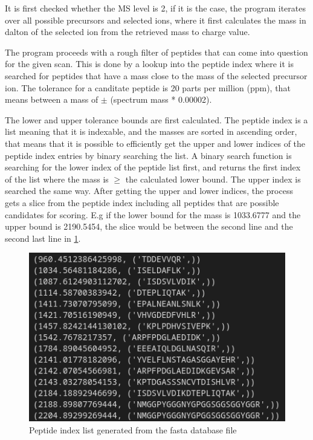 \documentclass[11pt]{article}
\begin{document}
It is first checked whether the MS level is 2, if it is the case, the program iterates over all possible precursors and selected ions, where it first calculates the mass in dalton of the selected ion from the retrieved mass to charge value.

The program proceeds with a rough filter of peptides that can come into question for the given scan. This is done by a lookup into the peptide index where it is searched for peptides that have a mass close to the mass of the selected precursor ion. The tolerance for a canditate peptide is 20 parts per million (ppm), that means between a mass of $\pm$ (spectrum mass * 0.00002).

The lower and upper tolerance bounds are first calculated. The peptide index is a list meaning that it is indexable, and the masses are sorted in ascending order, that means that it is possible to efficiently get the upper and lower indices of the peptide index entries by binary searching the list. A binary search function is searching for the lower index of the peptide list first, and returns the first index of the list where the mass is $\ge$ the calculated lower bound. The upper index is searched the same way. After getting the upper and lower indices, the process gets a slice from the peptide index including all peptides that are possible candidates for scoring. E.g if the lower bound for the mass is 1033.6777 and the upper bound is 2190.5454, the slice would be between the second line and the second last line in \cref{fig:peptindex}.
\begin{figure}
\includegraphics[width=\linewidth]{figs/peptindex.png} 
\caption{Peptide index list generated from the fasta database file}
\label{fig:peptindex}
\end{figure}
\end{document}
